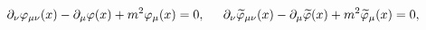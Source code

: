 \begin{equation}
\partial _\nu \varphi _{\mu \nu }(x)-\partial _\mu \varphi (x)+m^2\varphi _\mu
(x)=0 ,\hspace{0.2in}\partial _\nu \widetilde{\varphi }_{\mu \nu
}(x)-\partial _\mu \widetilde{\varphi }(x)+m^2\widetilde{\varphi
}_\mu (x)=0  ,\label{1}
\end{equation}

